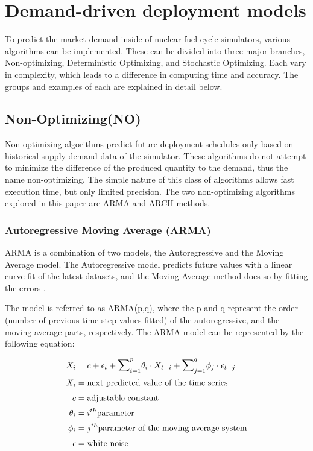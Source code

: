 \section{ Demand-driven deployment models}
To predict the market demand inside of nuclear fuel cycle simulators, various algorithms
can be implemented. These can be divided into three major
branches, Non-optimizing, Deterministic Optimizing, and Stochastic
Optimizing. Each vary in complexity, which leads to a difference
in computing time and accuracy. The groups and examples of each are 
explained in detail below. 

\subsection{Non-Optimizing(NO)}

Non-optimizing algorithms predict future deployment schedules
only based on historical supply-demand data of the simulator. These algorithms do not attempt
to minimize the difference of the produced quantity to the demand,
thus the name non-optimizing. The simple nature of this class of algorithms
allows fast execution time, but only limited precision. The
two non-optimizing algorithms explored in this paper are \gls{ARMA}
and \gls{ARCH} methods. 

\subsubsection{Autoregressive Moving Average (ARMA)}

\gls{ARMA} is a combination of two models, the Autoregressive
and the Moving Average model. The Autoregressive model 
predicts future values with a linear curve fit of the latest
datasets, and the Moving Average method does so by fitting the 
errors \cite{stine_introduction_2011}.

The model is referred to as ARMA(p,q), where the p and q represent 
the order (number of previous time step values fitted) of the autoregressive,
and the moving average parts,
respectively. 
The \gls{ARMA} model can be represented by the following equation:

\begin{align} 
	X_i&=c + \epsilon_t + {\mathlarger{\sum}}_{i=1}^{p}\theta_i \cdot X_{t-i}+
	 {\mathlarger{\sum}}_{j=1}^{q}\phi_j\cdot\epsilon_{t-j}\\
	X_i&= \mbox{next predicted value of the time series}\\
	c&= \mbox{adjustable constant}\\
	\theta_i&=i^{th} \mbox{parameter}\\
	\phi_i&=j^{th} \mbox{parameter of the moving average system}\\
	\epsilon &= \mbox{white noise}
\end{align}


